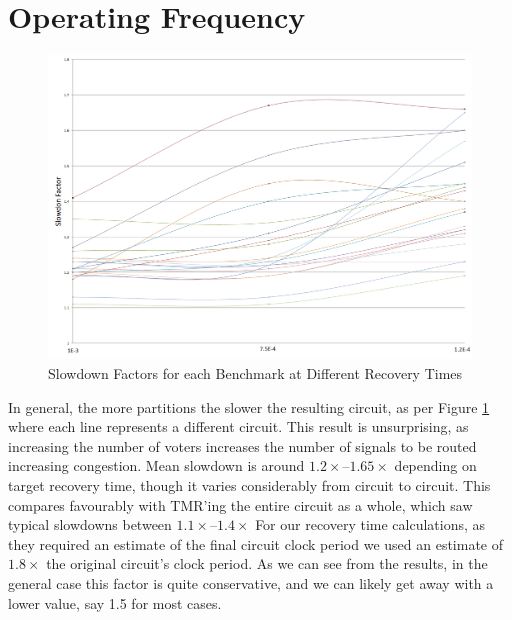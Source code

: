 \documentclass[12pt,final,oneside,a4paper]{dwThesis} %
\begin{document}
   \section{Operating Frequency}
      \begin{figure}

      \begin{center}

         \includegraphics[width=\textwidth]{images/slowdown.png}
         \caption{Slowdown Factors for each Benchmark at Different Recovery Times} \label{slowdownFig} 
      \end{center}


   \end{figure}
   In general, the more partitions the slower the
   resulting circuit, as per Figure \ref{slowdownFig} where each line represents a different circuit. This result is unsurprising, as increasing the number of
   voters increases the number of signals to be routed increasing congestion.
   Mean slowdown is around $1.2\times$--$1.65\times$ depending on target recovery time, though
   it varies considerably from circuit to circuit.
   This compares favourably with \gls{TMR}'ing the entire circuit as a whole, which saw typical slowdowns between $1.1\times$--$1.4\times$
     For our recovery time
   calculations, as they required an estimate of the final circuit clock period
   we used an estimate of $1.8\times$ the original circuit's clock period. As
   we can see from the results, in the general case this factor is quite
   conservative, and we can likely get away with a lower value, say 1.5 for
   most cases.
   
\end{document}
